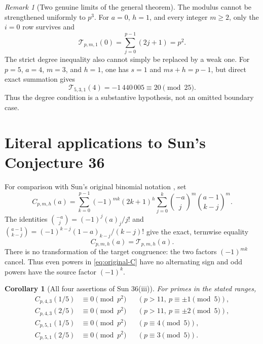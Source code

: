 \documentclass[11pt,a4paper]{article}
\newtheorem{corollary}[theorem]{Corollary}
\theoremstyle{remark}
\newtheorem{remark}[theorem]{Remark}
\begin{document}
\begin{remark}[Two genuine limits of the general theorem]
The modulus cannot be strengthened uniformly to $p^3$.
For $a=0$, $h=1$, and every integer $m\ge2$, only the $i=0$
row survives and
\[
 \mathcal T_{p,m,1}(0)=\sum_{j=0}^{p-1}(2j+1)=p^2.
\]
The strict degree inequality also cannot simply be replaced by a weak
one. For $p=5$, $a=4$, $m=3$, and $h=1$, one has $s=1$ and
$ms+h=p-1$, but direct exact summation gives
\[
 \mathcal T_{5,3,1}(4)=-1\,440\,005\equiv20\pmod{25}.
\]
Thus the degree condition is a substantive hypothesis, not an omitted
boundary case.
\end{remark}

\section{Literal applications to Sun's Conjecture 36}
\label{sec:sun}

For comparison with Sun's original binomial notation \cite{sun2019}, set
\begin{equation}\label{eq:original-C}
 C_{p,m,h}(a)=\sum_{k=0}^{p-1}(-1)^{mk}(2k+1)^h
       \sum_{j=0}^k\binom{-a}{j}^m\binom{a-1}{k-j}^m.
\end{equation}
The identities
$\binom{-a}{j}=(-1)^j(a)_j/j!$ and
$\binom{a-1}{k-j}=(-1)^{k-j}(1-a)_{k-j}/(k-j)!$
give the exact, termwise equality
\begin{equation}\label{eq:equivalence}
                         C_{p,m,h}(a)=\mathcal T_{p,m,h}(a).
\end{equation}
There is no transformation of the target congruence: the two factors
$(-1)^{mk}$ cancel. Thus even powers in \eqref{eq:original-C} have no
alternating sign and odd powers have the source factor $(-1)^k$.

\begin{corollary}[All four assertions of Sun 36(iii)]\label{cor:sun36iii}
For primes in the stated ranges,
\begin{align*}
 C_{p,4,3}(1/5)&\equiv0\pmod{p^2}
 &&(p>11,\ p\equiv\pm1\pmod5),\\
 C_{p,4,3}(2/5)&\equiv0\pmod{p^2}
 &&(p>11,\ p\equiv\pm2\pmod5),\\
 C_{p,5,1}(1/5)&\equiv0\pmod{p^2}
 &&(p\equiv4\pmod5),\\
 C_{p,5,1}(2/5)&\equiv0\pmod{p^2}
 &&(p\equiv3\pmod5).
\end{align*}
\end{corollary}
\end{document}

